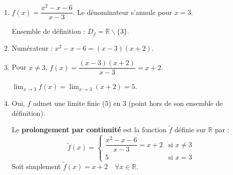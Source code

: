 \documentclass[11pt]{article}
\def\setminus{\mathbin{\backslash}}\let\smallsetminus\setminus
\begin{document}
\begin{corrige}
\begin{enumerate}
\item $f(x) = \dfrac{x^2 - x - 6}{x - 3}$. Le dénominateur s'annule pour $x=3$. \par
Ensemble de définition : $\boxed{D_f = \mathbb{R} \setminus \{3\}}$.
\item Numérateur : $x^2 - x - 6 = (x-3)(x+2)$.
\item Pour $x \neq 3$, $f(x) = \dfrac{(x-3)(x+2)}{x-3} = x+2$. \par
$\displaystyle\lim_{x \to 3} f(x) = \lim_{x \to 3} (x+2) = \boxed{5}$.
\item Oui, $f$ admet une limite finie ($5$) en $3$ (point hors de son ensemble de définition). \par
Le \textbf{prolongement par continuité} est la fonction $\tilde{f}$ définie sur $\mathbb{R}$ par :
\[
\tilde{f}(x) = \begin{cases} \dfrac{x^2 - x - 6}{x - 3} = x+2 & \text{si } x \neq 3 \\ 5 & \text{si } x = 3 \end{cases}
\]
Soit simplement $\boxed{\tilde{f}(x) = x+2 \quad \forall x \in \mathbb{R}}$.
\end{enumerate}
\end{corrige}
\end{document}
